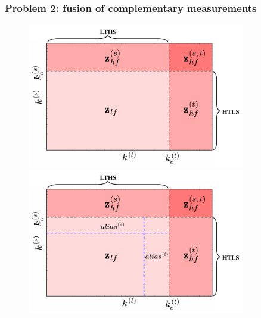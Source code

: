 \documentclass{beamer}
\begin{document}
\begin{frame}
\frametitle{Problem 2: fusion of complementary measurements}
	\begin{figure}
		\begin{overprint}
			\centerline{\includegraphics[width=0.85\textwidth]{./figures/turbulence/space_time_wavedomain_long.pdf}}
			\centerline{\includegraphics[width=0.85\textwidth]{./figures/turbulence/space_time_wavedomain_long_alias.pdf}}
		\end{overprint}			
	\end{figure}
\end{frame}
\end{document}

